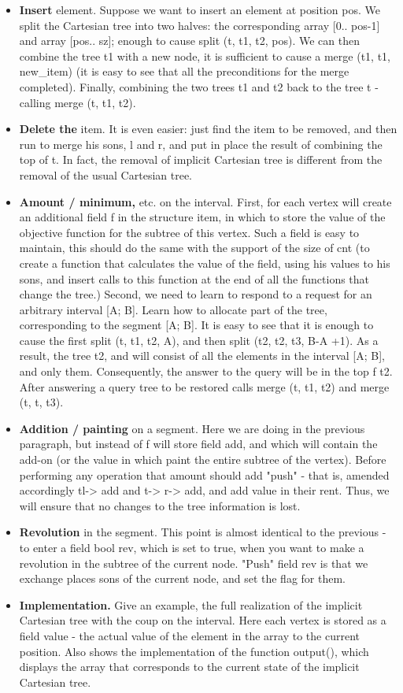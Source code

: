 \begin{itemize}
\item \textbf{Insert} element. 
Suppose we want to insert an element at position pos. We split the Cartesian tree into two halves: the corresponding array [0.. pos-1] and array [pos.. sz]; enough to cause split (t, t1, t2, pos). We can then combine the tree t1 with a new node, it is sufficient to cause a merge (t1, t1, new\_item) (it is easy to see that all the preconditions for the merge completed). Finally, combining the two trees t1 and t2 back to the tree t - calling merge (t, t1, t2).
\item \textbf{Delete the} item. 
It is even easier: just find the item to be removed, and then run to merge his sons, l and r, and put in place the result of combining the top of t. In fact, the removal of implicit Cartesian tree is different from the removal of the usual Cartesian tree.
\item \textbf{Amount / minimum,} etc. on the interval. 
First, for each vertex will create an additional field f in the structure item, in which to store the value of the objective function for the subtree of this vertex. Such a field is easy to maintain, this should do the same with the support of the size of cnt (to create a function that calculates the value of the field, using his values ​​to his sons, and insert calls to this function at the end of all the functions that change the tree.) 
Second, we need to learn to respond to a request for an arbitrary interval [A; B]. Learn how to allocate part of the tree, corresponding to the segment [A; B]. It is easy to see that it is enough to cause the first split (t, t1, t2, A), and then split (t2, t2, t3, B-A +1). As a result, the tree t2, and will consist of all the elements in the interval [A; B], and only them. Consequently, the answer to the query will be in the top f t2. After answering a query tree to be restored calls merge (t, t1, t2) and merge (t, t, t3).
\item \textbf{Addition / painting} on a segment. 
Here we are doing in the previous paragraph, but instead of f will store field add, and which will contain the add-on (or the value in which paint the entire subtree of the vertex). Before performing any operation that amount should add "push" - that is, amended accordingly tl-> add and t-> r-> add, and add value in their rent. Thus, we will ensure that no changes to the tree information is lost.
\item \textbf{Revolution} in the segment. 
This point is almost identical to the previous - to enter a field bool rev, which is set to true, when you want to make a revolution in the subtree of the current node. "Push" field rev is that we exchange places sons of the current node, and set the flag for them.
\item \textbf{Implementation.} Give an example, the full realization of the implicit Cartesian tree with the coup on the interval. Here each vertex is stored as a field value - the actual value of the element in the array to the current position. Also shows the implementation of the function output(), which displays the array that corresponds to the current state of the implicit Cartesian tree.
\end{itemize}

